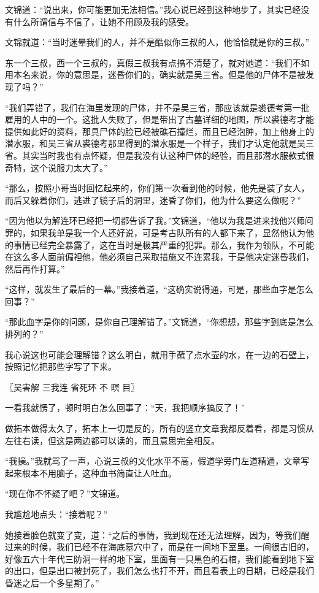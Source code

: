 文锦道：“说出来，你可能更加无法相信。”我心说已经到这种地步了，其实已经没有什么所谓信与不信了，让她不用顾及我的感受。

文锦就道：“当时迷晕我们的人，并不是酷似你三叔的人，他恰恰就是你的三叔。”

东一个三叔，西一个三叔的，真假三叔我有点搞不清楚了，就对她道：“我们不如用本名来说，你的意思是，迷昏你们的，确实就是吴三省。但是他的尸体不是被发现了吗？”

“我们弄错了，我们在海里发现的尸体，并不是吴三省，那应该就是裘德考第一批雇用的人中的一个。这批人失败了，但是带出了古墓详细的地图，所以裘德考才能提供如此好的资料，那具尸体的脸已经被礁石撞烂，而且已经泡肿，加上他身上的潜水服，和吴三省从裘德考那里得到的潜水服是一个样子，我们才认定他就是吴三省。其实当时我也有点怀疑，但是我没有认这种尸体的经验，而且那潜水服款式很奇特，这个说服力太大了。”

“那么，按照小哥当时回忆起来的，你们第一次看到他的时候，他先是装了女人，而后又躲着你们，逃进了镜子后的洞里，迷昏了你们，他为什么要这么做呢？”

“因为他以为解连环已经把一切都告诉了我。”文锦道，“他以为我是进来找他兴师问罪的，如果我单是我一个人还好说，可是考古队所有的人都下来了，显然他认为他的事情已经完全暴露了，这在当时是极其严重的犯罪。那么，我作为领队，不可能在这么多人面前偏袒他，他必须自己采取措施又不连累我，于是他决定迷昏我们，然后再作打算。”

“这样，就发生了最后的一幕。”我接着道，“这确实说得通，可是，那些血字是怎么回事？”

“那此血字是你的问题，是你自己理解错了。”文锦道，“你想想，那些字到底是怎么排列的？”

我心说这也可能会理解错？这么明白，就用手蘸了点水壶的水，在一边的石壁上，按照记忆把那些字写了下来。

〖吴害解
三我连
省死环
不
瞑
目〗

一看我就愣了，顿时明白怎么回事了：“天，我把顺序搞反了！”

做拓本做得太久了，拓本上一切是反的，所有的竖立文章我都反着看，都是习惯从左往右读，但这是两边都可以读的，而且意思完全相反。

“我操。”我就骂了一声，心说三叔的文化水平不高，假道学旁门左道精通，文章写起来根本不用脑子，这种血书简直让人吐血。

“现在你不怀疑了吧？”文锦道。

我尴尬地点头：“接着呢？”

她接着脸色就变了变，道：“之后的事情，我到现在还无法理解，因为，等我们醒过来的时候，我们已经不在海底墓穴中了，而是在一间地下室里。一间很古旧的，好像五六十年代三防洞一样的地下室，里面有一只黑色的石棺，我们能看到地下室的出口，但是出口被封死了，我们怎么也打不开，而且看表上的日期，已经是我们昏迷之后一个多星期了。”

